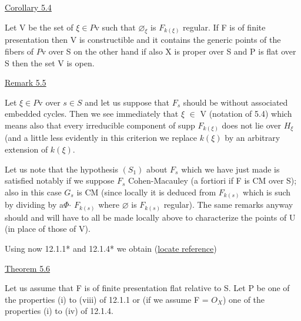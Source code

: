 
\uline{Corollary 5.4}

Let V be the set of $\xi \in P\mathrm{v}$ such that $\varnothing_{\xi}$ is $F_{k(\xi)}$ regular. If F
is of finite presentation then V is constructible and it contains
the generic points of the fibers of $P\mathrm{v}$ over S on the other hand if
also X is proper over S and P is flat over S then the set V is
open.

\uline{Remark 5.5}

Let $\xi \in P\mathrm{v}$ over $s \in S$ and let us suppose that $F_{s}$ should be
without associated embedded cycles. Then we see immediately that $\xi$
$\in$ V (notation of 5.4) which means also that every irreducible
component of supp $F_{k(\xi)}$ does not lie over $H_{\xi}$ (and a little less
evidently in this criterion we replace $k(\xi)$ by an arbitrary
extension of $k(\xi)$.

Let us note that the hypothesis $(S_{1})$ about $F_{s}$ which we have
just made is satisfied notably if we suppose $F_{s}$ Cohen-Macauley (a
fortiori if F is CM over S); also in this case $G_{s}$ is CM (since
locally it is deduced from $F_{k(s)}$ which is such by dividing by a$\Phi$$\cdot$
$F_{k(s)}$ where $\varnothing$ is $F_{k(s)}$ regular). The same remarks anyway should and
will have to all be made locally above to characterize the points
of U (in place of those of V).

Using now 12.1.1* and 12.1.4* we obtain (\uline{locate reference})

\uline{Theorem 5.6}

Let us assume that F is of finite presentation flat relative
to S. Let P be one of the properties (i) to (viii) of 12.1.1 or
(if we assume F = $O_{X}$) one of the properties (i) to (iv) of 12.1.4.


